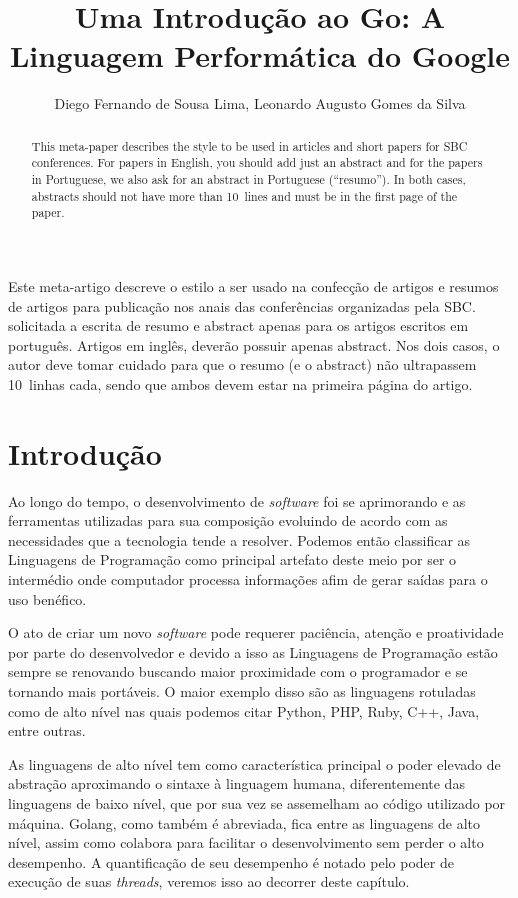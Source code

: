 \documentclass{SBCbookchapter}
\author{Diego Fernando de Sousa Lima, Leonardo Augusto Gomes da Silva}
\title{Uma Introdução ao Go: A Linguagem Performática do Google}
\begin{document}
\maketitle

\begin{abstract}
	This meta-paper describes the style to be used in articles and short
	papers for SBC conferences. For papers in English, you should add just
	an abstract and for the papers in Portuguese, we also ask for an
	abstract in Portuguese (``resumo''). In both cases, abstracts should not
	have more than 10~lines and must be in the first page of the paper.
\end{abstract}

\begin{resumo}
	\begin{otherlanguage}{brazilian}
		Este meta-artigo descreve o estilo a ser usado na confecção de artigos
		e resumos de artigos para publicação nos anais das conferências
		organizadas pela SBC.  solicitada a escrita de resumo e abstract apenas
		para os artigos escritos em português. Artigos em inglês, deverão
		possuir apenas abstract. Nos dois casos, o autor deve tomar cuidado para
		que o resumo (e o abstract) não ultrapassem 10~linhas cada, sendo que
		ambos devem estar na primeira página do artigo.
	\end{otherlanguage}
\end{resumo}

\section{Introdução}

Ao longo do tempo, o desenvolvimento de \textit{software} foi se aprimorando e as ferramentas utilizadas para sua composição evoluindo de acordo com as necessidades que a tecnologia tende a resolver. Podemos então classificar as Linguagens de Programação como principal artefato deste meio por ser o intermédio onde computador processa informações afim de gerar saídas para o uso benéfico.

O ato de criar um novo \textit{software} pode requerer paciência, atenção e proatividade por parte do desenvolvedor e devido a isso as Linguagens de Programação estão sempre se renovando buscando maior proximidade com o programador e se tornando mais portáveis. O maior exemplo disso são as linguagens rotuladas como de alto nível nas quais podemos citar Python, PHP, Ruby, C++, Java, entre outras.

As linguagens de alto nível tem como característica principal o poder elevado de abstração aproximando o sintaxe à linguagem humana, diferentemente das linguagens de baixo nível, que por sua vez se assemelham ao código utilizado por máquina. Golang, como também é abreviada, fica entre as linguagens de alto nível, assim como colabora para facilitar o desenvolvimento sem perder o alto desempenho. A quantificação de seu desempenho é notado pelo poder de execução de suas \textit{threads}, veremos isso ao decorrer deste capítulo. 
\end{document}

